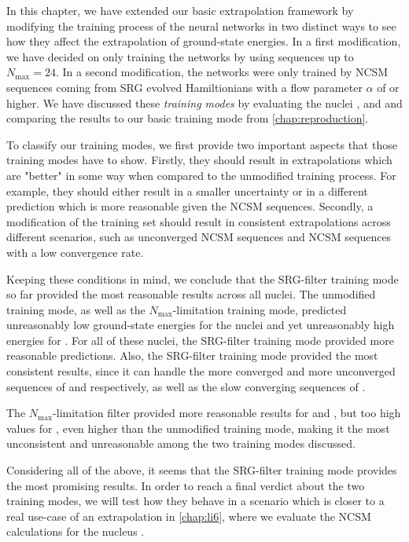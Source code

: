 In this chapter, we have extended our basic extrapolation framework by modifying the training process of the neural networks in two distinct ways to see how they affect the extrapolation of ground-state energies. In a first modification, we have decided on only training the networks by using sequences up to $N_\mathrm{max} = 24$. In a second modification, the networks were only trained by NCSM sequences coming from SRG evolved Hamiltionians with a flow parameter $\alpha$ of  or higher. We have discussed these \textit{training modes} by evaluating the nuclei ,  and  and comparing the results to our basic training mode from \autoref{chap:reproduction}.

To classify our training modes, we first provide two important aspects that those training modes have to show. Firstly, they should result in extrapolations which are "better" in some way when compared to the unmodified training process. For example, they should either result in a smaller uncertainty or in a different prediction which is more reasonable given the NCSM sequences. Secondly, a modification of the training set should result in consistent extrapolations across different scenarios, such as unconverged NCSM sequences and NCSM sequences with a low convergence rate.

Keeping these conditions in mind, we conclude that the SRG-filter training mode so far provided the most reasonable results across all nuclei. The unmodified training mode, as well as the $N_\mathrm{max}$-limitation training mode, predicted unreasonably low ground-state energies for the nuclei  and  yet unreasonably high energies for . For all of these nuclei, the SRG-filter training mode provided more reasonable predictions. Also, the SRG-filter training mode provided the most consistent results, since it can handle the more converged and more unconverged sequences of  and  respectively, as well as the slow converging sequences of .

The $N_\mathrm{max}$-limitation filter provided more reasonable results for  and , but too high values for , even higher than the unmodified training mode, making it the most unconsistent and unreasonable among the two training modes discussed.

Considering all of the above, it seems that the SRG-filter training mode provides the most promising results. In order to reach a final verdict about the two training modes, we will test how they behave in a scenario which is closer to a real use-case of an extrapolation in \autoref{chap:li6}, where we evaluate the NCSM calculations for the nucleus .
